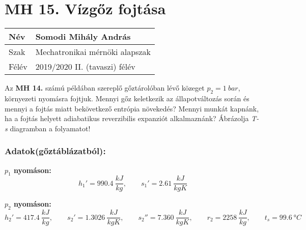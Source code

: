 \section*{MH 15. Vízgőz fojtása}

\begin{tabular}{ | p{2cm} | p{14cm} | }
	\hline
	Név & Somodi Mihály András \\
	\hline
	Szak & Mechatronikai mérnöki alapszak\\
	\hline
	Félév & 2019/2020 II. (tavaszi) félév \\ 
	\hline
\end{tabular}

\vspace{0.5cm}

\noindent Az \textbf{MH 14.} számú példában szereplő gőztárolóban lévő közeget $p_{2} = \SI{1}{bar}$, környezeti nyomásra fojtjuk. Mennyi gőz keletkezik az állapotváltozás során és mennyi a fojtás miatt bekövetkező entrópia növekedés? Mennyi munkát kapnánk, ha a fojtás helyett adiabatikus reverzibilis expanziót alkalmaznánk? Ábrázolja \textit{T-s} diagramban a folyamatot!

\subsubsection{Adatok(gőztáblázatból):}
\noindent\textbf{ $p_{1}$ nyomáson:}
\begin{equation*}
	h_{1}' =\SI{990,4}{\dfrac{kJ}{kg}},
	\qquad
	s_{1}' =\SI{2,61}{\dfrac{kJ}{kgK}}
\end{equation*}

\noindent\textbf{ $p_{2}$ nyomáson:}
\begin{equation*}
	h_{2}' = \SI{417,4}{\dfrac{kJ}{kg}},
	\qquad
	s_{2}' = \SI{1,3026}{\dfrac{kJ}{kgK}},
	\qquad
	s_{2}'' = \SI{7,360}{\dfrac{kJ}{kgK}},
	\qquad
	r_{2} = \SI{2258}{\dfrac{kJ}{kg}},
	\qquad
	t_{s} = \SI{99,6}{°C}
\end{equation*}

\noindent\hrulefill

